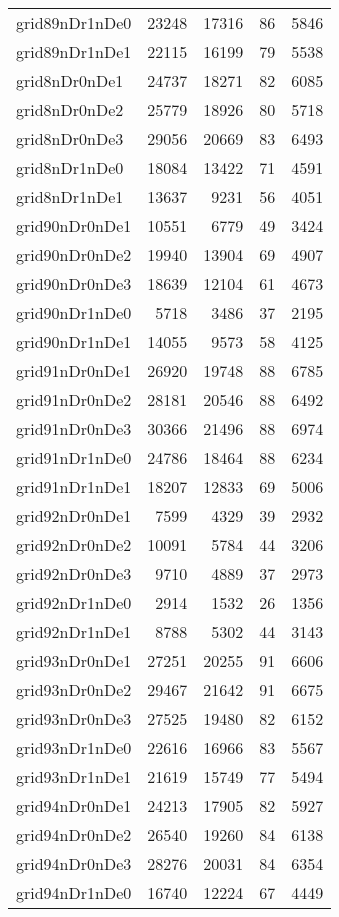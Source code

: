 \begin{longtable}{lrrrr}
grid89nDr1nDe0 & 23248 & 17316 & 86 & 5846 \\
grid89nDr1nDe1 & 22115 & 16199 & 79 & 5538 \\
grid8nDr0nDe1 & 24737 & 18271 & 82 & 6085 \\
grid8nDr0nDe2 & 25779 & 18926 & 80 & 5718 \\
grid8nDr0nDe3 & 29056 & 20669 & 83 & 6493 \\
grid8nDr1nDe0 & 18084 & 13422 & 71 & 4591 \\
grid8nDr1nDe1 & 13637 & 9231 & 56 & 4051 \\
grid90nDr0nDe1 & 10551 & 6779 & 49 & 3424 \\
grid90nDr0nDe2 & 19940 & 13904 & 69 & 4907 \\
grid90nDr0nDe3 & 18639 & 12104 & 61 & 4673 \\
grid90nDr1nDe0 & 5718 & 3486 & 37 & 2195 \\
grid90nDr1nDe1 & 14055 & 9573 & 58 & 4125 \\
grid91nDr0nDe1 & 26920 & 19748 & 88 & 6785 \\
grid91nDr0nDe2 & 28181 & 20546 & 88 & 6492 \\
grid91nDr0nDe3 & 30366 & 21496 & 88 & 6974 \\
grid91nDr1nDe0 & 24786 & 18464 & 88 & 6234 \\
grid91nDr1nDe1 & 18207 & 12833 & 69 & 5006 \\
grid92nDr0nDe1 & 7599 & 4329 & 39 & 2932 \\
grid92nDr0nDe2 & 10091 & 5784 & 44 & 3206 \\
grid92nDr0nDe3 & 9710 & 4889 & 37 & 2973 \\
grid92nDr1nDe0 & 2914 & 1532 & 26 & 1356 \\
grid92nDr1nDe1 & 8788 & 5302 & 44 & 3143 \\
grid93nDr0nDe1 & 27251 & 20255 & 91 & 6606 \\
grid93nDr0nDe2 & 29467 & 21642 & 91 & 6675 \\
grid93nDr0nDe3 & 27525 & 19480 & 82 & 6152 \\
grid93nDr1nDe0 & 22616 & 16966 & 83 & 5567 \\
grid93nDr1nDe1 & 21619 & 15749 & 77 & 5494 \\
grid94nDr0nDe1 & 24213 & 17905 & 82 & 5927 \\
grid94nDr0nDe2 & 26540 & 19260 & 84 & 6138 \\
grid94nDr0nDe3 & 28276 & 20031 & 84 & 6354 \\
grid94nDr1nDe0 & 16740 & 12224 & 67 & 4449 \\

\end{longtable}
